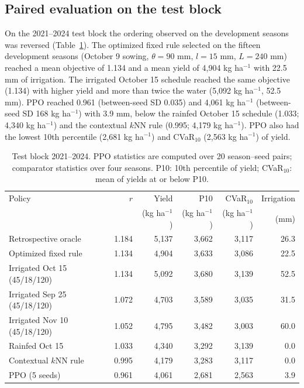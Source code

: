 \documentclass[times,final,authoryear]{elsarticle}
\begin{document}
\subsection{Paired evaluation on the test block}
\label{subres_test}

On the 2021--2024 test block the ordering observed on the development seasons was reversed (Table~\ref{tab_test_summary}). The optimized fixed rule selected on the fifteen development seasons (October 9 sowing, $\theta = 90$ mm, $l = 15$ mm, $L = 240$ mm) reached a mean objective of 1.134 and a mean yield of 4,904 kg ha$^{-1}$ with 22.5 mm of irrigation. The irrigated October 15 schedule reached the same objective (1.134) with higher yield and more than twice the water (5,092 kg ha$^{-1}$, 52.5 mm). PPO reached 0.961 (between-seed SD 0.035) and 4,061 kg ha$^{-1}$ (between-seed SD 168 kg ha$^{-1}$) with 3.9 mm, below the rainfed October 15 schedule (1.033; 4,340 kg ha$^{-1}$) and the contextual $k$NN rule (0.995; 4,179 kg ha$^{-1}$). PPO also had the lowest 10th percentile (2,681 kg ha$^{-1}$) and CVaR$_{10}$ (2,563 kg ha$^{-1}$) of yield.

\begin{table}[!h]
\centering
\scriptsize
\caption{Test block 2021--2024. PPO statistics are computed over 20 season--seed pairs; comparator statistics over four seasons. P10: 10th percentile of yield; CVaR$_{10}$: mean of yields at or below P10.}
\label{tab_test_summary}
\begin{tabular}{lrrrrr}
\hline
Policy & $r$ & Yield & P10 & CVaR$_{10}$ & Irrigation \\
       &     & (kg ha$^{-1}$) & (kg ha$^{-1}$) & (kg ha$^{-1}$) & (mm) \\
\hline
Retrospective oracle & 1.184 & 5,137 & 3,662 & 3,117 & 26.3 \\
Optimized fixed rule & 1.134 & 4,904 & 3,633 & 3,086 & 22.5 \\
Irrigated Oct 15 (45/18/120) & 1.134 & 5,092 & 3,680 & 3,139 & 52.5 \\
Irrigated Sep 25 (45/18/120) & 1.072 & 4,703 & 3,589 & 3,035 & 31.5 \\
Irrigated Nov 10 (45/18/120) & 1.052 & 4,795 & 3,482 & 3,003 & 60.0 \\
Rainfed Oct 15 & 1.033 & 4,340 & 3,292 & 3,139 & 0.0 \\
Contextual $k$NN rule & 0.995 & 4,179 & 3,283 & 3,117 & 0.0 \\
PPO (5 seeds) & 0.961 & 4,061 & 2,681 & 2,563 & 3.9 \\
\hline
\end{tabular}
\end{table}
\end{document}

